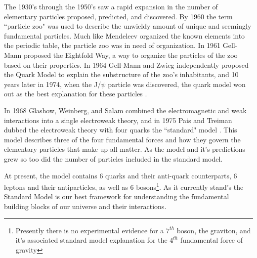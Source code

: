 \documentclass[12pt]{niuthesis}
\begin{document}
    The 1930's through the 1950's saw a rapid expansion in the number of elementary particles proposed, predicted, and discovered. By 1960 the term ``particle zoo" was used to describe the unwieldy amount of unique and seemingly fundamental particles. Much like Mendeleev organized the known elements into the periodic table, the particle zoo was in need of organization. In 1961 Gell-Mann proposed the Eightfold Way, a way to organize the particles of the zoo based on their properties. In 1964 Gell-Mann and Zwieg independently proposed the Quark Model to explain the substructure of the zoo's inhabitants, and 10 years later in 1974, when the J/$\psi$  particle was discovered, the quark model won out as the best explanation for these particles \cite{Giffiths}.

    In 1968 Glashow, Weinberg, and Salam combined the electromagnetic and weak interactions into a single electroweak theory, and in 1975 Pais and Treiman dubbed the electroweak theory with four quarks the ``standard" model \cite{Pais1}. This model describes three of the four fundamental forces and how they govern the elementary particles that make up all matter. As the model and it's predictions grew so too did the number of particles included in the standard model. 

    At present, the model contains 6 quarks and their anti-quark counterparts, 6 leptons and their antiparticles, as well as 6 bosons\footnote{Presently there is no experimental evidence for a $7^{th}$ boson, the graviton, and it's associated standard model explanation for the $4^{th}$ fundamental force of gravity}. As it currently stand's the Standard Model is our best framework for understanding the fundamental building blocks of our universe and their interactions. 


\end{document}

